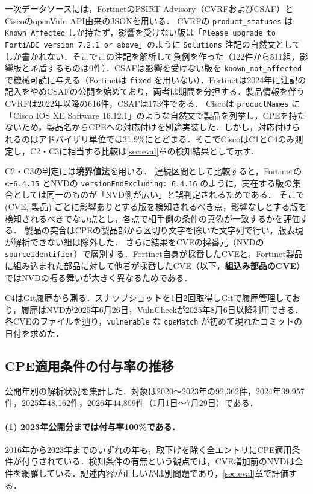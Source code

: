 一次データソースには，FortinetのPSIRT Advisory（CVRFおよびCSAF\cite{vuls-data-raw-fortinet}）とCiscoのopenVuln API由来のJSON\cite{vuls-data-raw-cisco-json}を用いる．
CVRFの \texttt{product\_statuses} は \texttt{Known Affected} しか持たず，影響を受けない版は「\texttt{Please upgrade to FortiADC version 7.2.1 or above}」のように \texttt{Solutions} 注記の自然文としてしか書かれない．そこでこの注記を解析して負例を作った（122件から511組，影響版と矛盾するものは0件）．CSAFは影響を受けない版を \texttt{known\_not\_affected} で機械可読に与える（Fortinetは \texttt{fixed} を用いない）．Fortinetは2024年に注記の記入をやめCSAFの公開を始めており，両者は期間を分担する．製品情報を伴うCVRFは2022年以降の616件，CSAFは173件である．
Ciscoは \texttt{productNames} に「Cisco IOS XE Software 16.12.1」のような自然文で製品を列挙し，CPEを持たないため，製品名からCPEへの対応付けを別途実装した．しかし，対応付けられるのはアドバイザリ単位では31.9\%にとどまる．そこでCiscoはC1とC4のみ測定し，C2・C3に相当する比較は\ref{sec:eval}章の検知結果として示す．

C2・C3の判定には\textbf{境界値法}を用いる．
連続区間として比較すると，Fortinetの \texttt{<=6.4.15} とNVDの \texttt{versionEndExcluding: 6.4.16} のように，実在する版の集合としては同一のものが「NVD側が広い」と誤判定されるためである．
そこで (CVE, 製品) ごとに影響ありとする版を検知されるべき点，影響なしとする版を検知されるべきでない点とし，各点で相手側の条件の真偽が一致するかを評価する．
製品の突合はCPEの製品部から区切り文字を除いた文字列で行い，版表現が解析できない組は除外した．
さらに結果をCVEの採番元（NVDの \texttt{sourceIdentifier}）で層別する．Fortinet自身が採番したCVEと，Fortinet製品に組み込まれた部品に対して他者が採番したCVE（以下，\textbf{組込み部品のCVE}）ではNVDの振る舞いが大きく異なるためである．

C4はGit履歴から測る．スナップショットを1日2回取得しGitで履歴管理しており\cite{vuls-data-db}，履歴はNVDが2025年6月26日，VulnCheckが2025年8月6日以降利用できる．各CVEのファイルを辿り，\texttt{vulnerable} な \texttt{cpeMatch} が初めて現れたコミットの日付を求めた．

\subsection{CPE適用条件の付与率の推移}
\label{sec:year}

公開年別の解析状況を集計した．対象は2020〜2023年の92,362件，2024年39,957件，2025年48,162件，2026年44,809件（1月1日〜7月29日）である．

\paragraph{(1) 2023年公開分までは付与率100\%である．}
2016年から2023年までのいずれの年も，取下げを除く全エントリにCPE適用条件が付与されている．検知条件の有無という観点では，CVE増加前のNVDは全件を網羅している．記述内容が正しいかは別問題であり\cite{dong2019,nguyen2013}，\ref{sec:eval}章で評価する．

